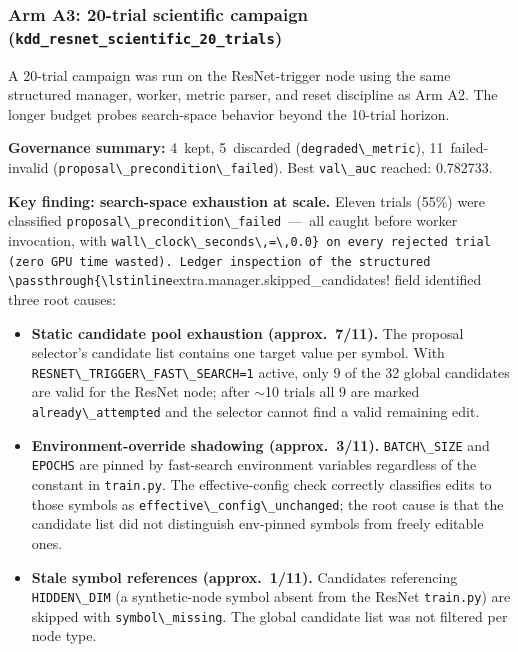 \subsubsection{\texorpdfstring{Arm A3: 20-trial scientific campaign (\texttt{kdd\_resnet\_scientific\_20\_trials})}{Arm A3: 20-trial scientific campaign}}\label{arm-a3-20-trial-scientific}

A 20-trial campaign was run on the ResNet-trigger node using the same structured manager, worker, metric parser, and reset discipline as Arm A2. The longer budget probes search-space behavior beyond the 10-trial horizon.

\textbf{Governance summary:} 4~kept, 5~discarded (\passthrough{\lstinline!degraded\_metric!}), 11~failed-invalid (\passthrough{\lstinline!proposal\_precondition\_failed!}). Best \passthrough{\lstinline!val\_auc!} reached: 0.782733.

\textbf{Key finding: search-space exhaustion at scale.} Eleven trials (55\%) were classified \passthrough{\lstinline!proposal\_precondition\_failed!}~---~all caught before worker invocation, with \passthrough{\lstinline!wall\_clock\_seconds\,=\,0.0} on every rejected trial (zero GPU time wasted). Ledger inspection of the structured \passthrough{\lstinline!extra.manager.skipped\_candidates!} field identified three root causes:

\begin{itemize}
\tightlist
\item \textbf{Static candidate pool exhaustion (approx.\ 7/11).} The proposal selector's candidate list contains one target value per symbol. With \passthrough{\lstinline!RESNET\_TRIGGER\_FAST\_SEARCH=1!} active, only 9 of the 32 global candidates are valid for the ResNet node; after $\sim$10 trials all 9 are marked \passthrough{\lstinline!already\_attempted!} and the selector cannot find a valid remaining edit.
\item \textbf{Environment-override shadowing (approx.\ 3/11).} \passthrough{\lstinline!BATCH\_SIZE!} and \passthrough{\lstinline!EPOCHS!} are pinned by fast-search environment variables regardless of the constant in \passthrough{\lstinline!train.py!}. The effective-config check correctly classifies edits to those symbols as \passthrough{\lstinline!effective\_config\_unchanged!}; the root cause is that the candidate list did not distinguish env-pinned symbols from freely editable ones.
\item \textbf{Stale symbol references (approx.\ 1/11).} Candidates referencing \passthrough{\lstinline!HIDDEN\_DIM!} (a synthetic-node symbol absent from the ResNet \passthrough{\lstinline!train.py!}) are skipped with \passthrough{\lstinline!symbol\_missing!}. The global candidate list was not filtered per node type.
\end{itemize}

